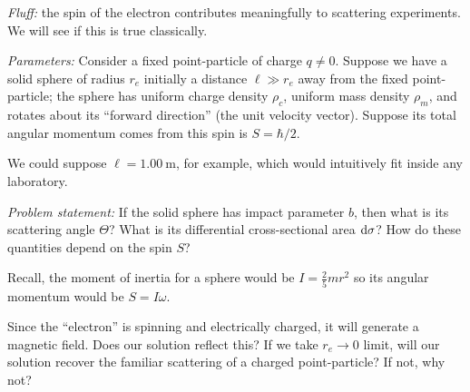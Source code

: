 \begin{exercise}
\textit{Fluff:} the spin of the electron contributes meaningfully to
scattering experiments. We will see if this is true classically.

\textit{Parameters:}
Consider a fixed point-particle of charge $q\neq0$.
Suppose we have a solid sphere of radius $r_{e}$ initially a distance
$\ell\gg r_{e}$ away from the fixed point-particle; the sphere has
uniform charge density $\rho_{c}$, uniform mass density $\rho_{m}$, and
rotates about its ``forward direction'' (the unit velocity
vector). Suppose its total angular momentum comes from this spin is $S=\hbar/2$.

We could suppose $\ell=1.00~\mathrm{m}$, for example, which would
intuitively fit inside any laboratory.

\textit{Problem statement:}
If the solid sphere has impact parameter $b$, then what is its
scattering angle $\Theta$? What is its differential cross-sectional area $\mathrm{d}\sigma$?
How do these quantities depend on the spin $S$?
\end{exercise}

\begin{remark}
Recall, the moment of inertia for a sphere would be $I=\frac{2}{5}mr^{2}$
so its angular momentum would be $S=I\omega$.
\end{remark}

\begin{remark}
Since the ``electron'' is spinning and electrically charged, it will
generate a magnetic field. Does our solution reflect this? If we take
$r_{e}\to0$ limit, will our solution recover the familiar scattering of
a charged point-particle? If not, why not?
\end{remark}
